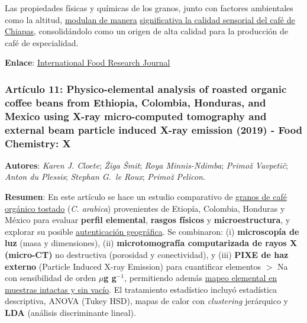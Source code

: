 \documentclass{article}
\begin{document}
Las propiedades físicas y químicas de los granos, junto con factores ambientales como la altitud, \underline{modulan de manera} \underline{significativa la calidad sensorial del café de Chiapas}, consolidándolo como un origen de alta calidad para la producción de café de especialidad.  

\textbf{Enlace}: \href{http://www.ifrj.upm.edu.my/27%20(04)%202020/DONE%20-%2018%20-%20IFRJ19993.R1.pdf}{International Food Research Journal} \vspace{0.5cm}


\subsubsection{\textbf{Artículo 11:} \textcolor{Mustard}{\textbf{Physico-elemental analysis of roasted organic coffee beans from Ethiopia, Colombia, Honduras, and Mexico using X-ray micro-computed tomography and external beam particle induced X-ray emission (2019) - Food Chemistry: X }}} \vspace{0.5cm}

\textbf{Autores}: \textit{Karen J. Cloete}; \textit{\v{Z}iga \v{S}mit}; \textit{Roya Minnis{-}Ndimba}; \textit{Primo\v{z} Vavpeti\v{c}}; \textit{Anton du Plessis}; \textit{Stephan G.\ le Roux}; \textit{Primo\v{z} Pelicon}. \vspace{0.5cm}

\textbf{Resumen}: En este artículo se hace un estudio comparativo de \underline{granos de café orgánico tostado} (\textit{C. arabica}) provenientes de Etiopía, Colombia, Honduras y México para evaluar \textbf{perfil elemental}, \textbf{rasgos físicos} y \textbf{microestructura}, y explorar su posible \underline{autenticación geográfica}. Se combinaron: (i) \textbf{microscopía de luz} (masa y dimensiones), (ii) \textbf{microtomografía computarizada de rayos X (micro{-}CT)} no destructiva (porosidad y conectividad), y (iii) \textbf{PIXE de haz externo} (Particle Induced X-ray Emission) para cuantificar elementos $>$ Na con sensibilidad de orden \textbf{$\mu$g g$^{-1}$}, permitiendo además \underline{mapeo elemental en muestras intactas y sin vacío}. El tratamiento estadístico incluyó estadística descriptiva, ANOVA (Tukey HSD), mapas de calor con \textit{clustering} jerárquico y \textbf{LDA} (análisis discriminante lineal). \vspace{0.5cm}
\end{document}
